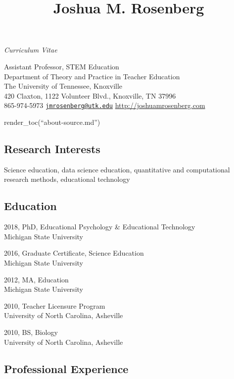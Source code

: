 \documentclass[14,]{article}
\title{Joshua M. Rosenberg}
\author{}
\date{}
\begin{document}
\maketitle

\begin{center}
\textit{Curriculum Vitae}
\end{center}

\begingroup
\center

Assistant Professor, STEM Education\\
Department of Theory and Practice in Teacher Education\\
The University of Tennessee, Knoxville\\
420 Claxton, 1122 Volunteer Blvd., Knoxville, TN 37996\\
865-974-5973 \textbar{}
\href{mailto:jmrosenberg@utk.edu}{\nolinkurl{jmrosenberg@utk.edu}}
\textbar{} \url{http://joshuamrosenberg.com}\\
\endgroup

render\_toc(``about-source.md'')

\hypertarget{research-interests}{%
\subsection{Research Interests}\label{research-interests}}

Science education, data science education, quantitative and
computational research methods, educational technology

\hypertarget{education}{%
\subsection{Education}\label{education}}

2018, PhD, Educational Psychology \& Educational Technology\\
Michigan State University

2016, Graduate Certificate, Science Education\\
Michigan State University

2012, MA, Education\\
Michigan State University

2010, Teacher Licensure Program\\
University of North Carolina, Asheville

2010, BS, Biology\\
University of North Carolina, Asheville

\hypertarget{professional-experience}{%
\subsection{Professional Experience}\label{professional-experience}}
\end{document}
